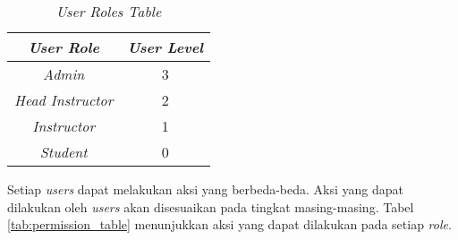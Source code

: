 \begin{table}[H]
	\centering 
	\caption{\textit{User Roles Table}}
	\label{tab:user_role}
	\begin{tabular}{|c|c|}
		\hline
		\textit{\textbf{User Role}} & \textit{\textbf{User Level}} \\
		\hline
		\textit{Admin} & 3 \\
		\hline
		\textit{Head Instructor} & 2 \\
		\hline
		\textit{Instructor} & 1 \\
		\hline
		\textit{Student} & 0 \\
		\hline		
	\end{tabular} 
\end{table}

Setiap \textit{users} dapat melakukan aksi yang berbeda-beda. Aksi yang dapat dilakukan oleh \textit{users} akan disesuaikan pada tingkat masing-masing. Tabel \ref{tab:permission_table} menunjukkan aksi yang dapat dilakukan pada setiap \textit{role}.

